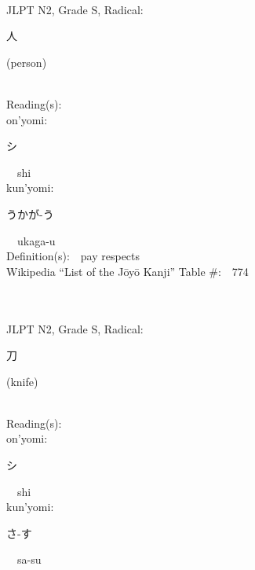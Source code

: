 \begin{multicols}{2}
{\fontsize{34pt}{40pt}  }\ \ \\  %
{JLPT N2, Grade S, Radical:\ \ {\begin{CJK}{UTF8}{min} 人 \end{CJK}} (person) } \\
Reading(s):\ \ \\
{\hspace*{1em}}on'yomi:\ \ \\
{\hspace*{2em}}{\begin{CJK}{UTF8}{min} シ \end{CJK}}\ \ shi\ \ \\
{\hspace*{1em}}kun'yomi:\ \ \\
{\hspace*{2em}}{\begin{CJK}{UTF8}{min} うかが-う \end{CJK}}\ \ ukaga-u\ \ \\
Definition(s):\ \ pay respects \\
Wikipedia ``List of the J\=oy\=o Kanji'' Table \#:\ \ 774 \\
\ \ \\
{\fontsize{34pt}{40pt}  }\ \ \\  %
{JLPT N2, Grade S, Radical:\ \ {\begin{CJK}{UTF8}{min} 刀 \end{CJK}} (knife) } \\
Reading(s):\ \ \\
{\hspace*{1em}}on'yomi:\ \ \\
{\hspace*{2em}}{\begin{CJK}{UTF8}{min} シ \end{CJK}}\ \ shi\ \ \\
{\hspace*{1em}}kun'yomi:\ \ \\
{\hspace*{2em}}{\begin{CJK}{UTF8}{min} さ-す \end{CJK}}\ \ sa-su\ \ \\

\end{multicols}
